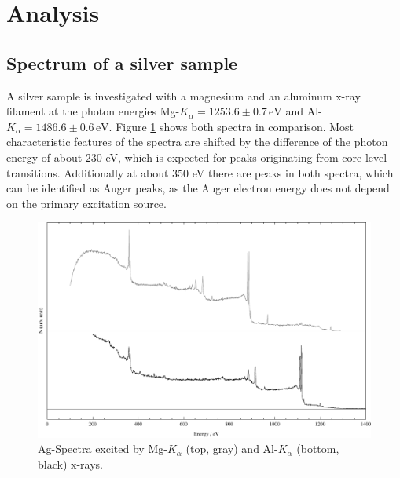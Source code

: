 \documentclass[a4paper]{scrartcl}
\numberwithin{equation}{section}
\numberwithin{figure}{section}
\numberwithin{table}{section}
\begin{document}
\clearpage
\section{Analysis}
\subsection{Spectrum of a silver sample}
A silver sample is investigated with a magnesium and an aluminum x-ray filament at the photon energies Mg-$K_\alpha=1253.6 \pm 0.7\,\text{eV}$ and Al-$K_\alpha=1486.6\pm 0.6 \,\text{eV}$. Figure \ref{fig:compare} shows both spectra in comparison. Most characteristic features of the spectra are shifted by the difference of the photon energy of about $230$ eV, which is expected for peaks originating from core-level transitions. Additionally at about $350$ eV there are peaks in both spectra, which can be identified as Auger peaks, as the Auger electron energy does not depend on the primary excitation source.

\begin{figure}
  \centering
   	\includegraphics[width=0.75\linewidth]{img/compare.pdf}
 \caption{\small Ag-Spectra excited by Mg-$K_\alpha$ (top, gray) and Al-$K_\alpha$ (bottom, black) x-rays.  }
        \label{fig:compare}
\end{figure}
\end{document}

